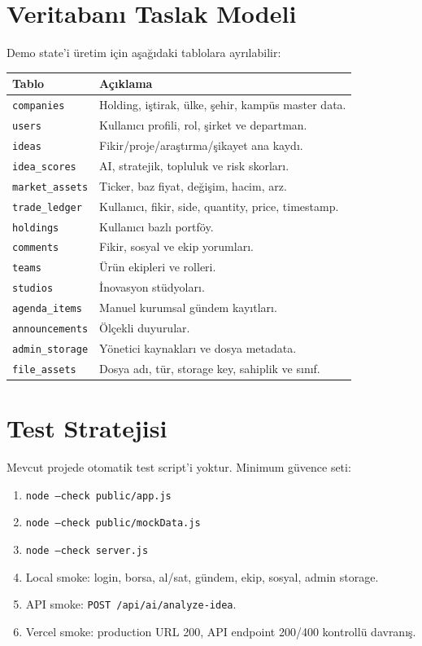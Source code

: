 \documentclass[11pt,a4paper]{article}
\newcommand{\code}[1]{\texttt{#1}}
\begin{document}
\section{Veritabanı Taslak Modeli}

Demo state'i üretim için aşağıdaki tablolara ayrılabilir:

\begin{longtable}{p{}p{}}
\toprule
\textbf{Tablo} & \textbf{Açıklama}\\
\midrule
\code{companies} & Holding, iştirak, ülke, şehir, kampüs master data.\\
\code{users} & Kullanıcı profili, rol, şirket ve departman.\\
\code{ideas} & Fikir/proje/araştırma/şikayet ana kaydı.\\
\code{idea_scores} & AI, stratejik, topluluk ve risk skorları.\\
\code{market_assets} & Ticker, baz fiyat, değişim, hacim, arz.\\
\code{trade_ledger} & Kullanıcı, fikir, side, quantity, price, timestamp.\\
\code{holdings} & Kullanıcı bazlı portföy.\\
\code{comments} & Fikir, sosyal ve ekip yorumları.\\
\code{teams} & Ürün ekipleri ve rolleri.\\
\code{studios} & İnovasyon stüdyoları.\\
\code{agenda_items} & Manuel kurumsal gündem kayıtları.\\
\code{announcements} & Ölçekli duyurular.\\
\code{admin_storage} & Yönetici kaynakları ve dosya metadata.\\
\code{file_assets} & Dosya adı, tür, storage key, sahiplik ve sınıf.\\
\bottomrule
\end{longtable}

\section{Test Stratejisi}

Mevcut projede otomatik test script'i yoktur. Minimum güvence seti:

\begin{enumerate}
  \item \code{node --check public/app.js}
  \item \code{node --check public/mockData.js}
  \item \code{node --check server.js}
  \item Local smoke: login, borsa, al/sat, gündem, ekip, sosyal, admin storage.
  \item API smoke: \code{POST /api/ai/analyze-idea}.
  \item Vercel smoke: production URL 200, API endpoint 200/400 kontrollü davranış.
\end{enumerate}
\end{document}

